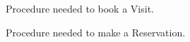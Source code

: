 \begin{figure}[H]
  \label{Visit_steps}
  \caption{Procedure needed to book a Visit.}
  \centering
\end{figure}


\begin{figure}[H]
  \label{Reservation_steps}
 \caption{Procedure needed to make a Reservation.}
  \centering
\end{figure}


